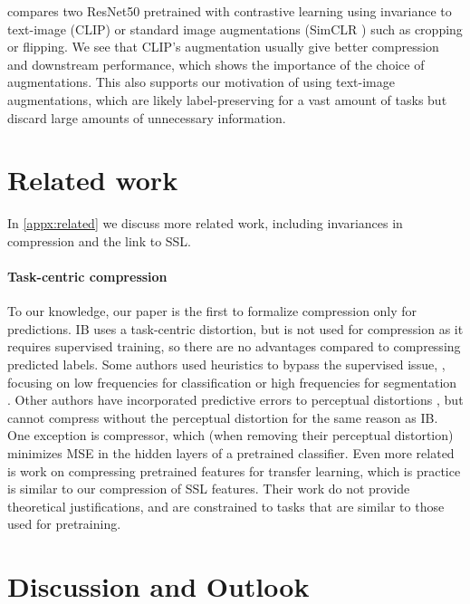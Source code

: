 \documentclass[final]{article}
\begin{document}
 compares two ResNet50 pretrained with contrastive learning using invariance to text-image (CLIP) or standard image augmentations (SimCLR \cite{chen_simple_2020}) such as cropping or flipping. 
We see that CLIP's augmentation usually give better compression and downstream performance, which shows the importance of the choice of augmentations.
This also supports our motivation of using text-image augmentations, which are likely label-preserving for a vast amount of tasks but discard large amounts of unnecessary information. 

 
\section{Related work}
\label{sec:related}
In \cref{appx:related} we discuss more related work, including invariances in compression and the link to SSL.


\paragraph{Task-centric compression}
To our knowledge, our paper is the first to formalize compression only for predictions.
IB \cite{tishby_information_2000} uses a task-centric distortion, but is not used for compression as it requires supervised training, so there are no advantages compared to compressing predicted labels.
Some authors used heuristics to bypass the supervised issue, \eg, focusing on low frequencies for classification \cite{liu_deepn-jpeg_2018} or high frequencies for segmentation \cite{liu_machine_2019}.
Other authors have incorporated predictive errors to perceptual distortions \cite{liu_recognizable_2016,liu_classification-distortion-perception_2019}, but cannot compress without the perceptual distortion for the same reason as IB. 
One exception is  compressor, which (when removing their perceptual distortion) minimizes MSE in the hidden layers of a pretrained classifier.
Even more related is  work on compressing pretrained features for transfer learning, which is practice is similar to our compression of SSL features.
Their work do not provide theoretical justifications, and are constrained to tasks that are similar to those used for pretraining.




 
\section{Discussion and Outlook}
\label{sec:conclusion}
\end{document}
